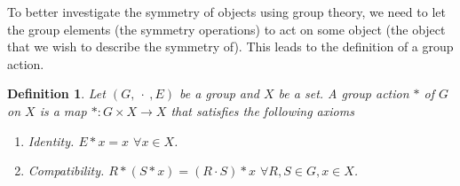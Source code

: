 \documentclass{article}
\theoremstyle{plain}\theoremheaderfont{\normalfont\itshape}\theorembodyfont{\rmfamily}\theoremseparator{.}\newtheorem*{rem}{Remark}\newtheorem*{ex}{Example}\newtheorem*{proof}{Proof}\newtheorem*{altp}{Alternative proof}
\theoremstyle{plain}\theoremheaderfont{\normalfont\bfseries}\theorembodyfont{\rmfamily}\theoremseparator{.}\newtheorem{thm}{Theorem}[section]\newtheorem{lem}[thm]{Lemma}\newtheorem{prop}[thm]{Proposition}\newtheorem*{cor}{Corollary}\newtheorem{defn}[thm]{Definition}\newtheorem{clm}[thm]{Claim}\newtheorem{clminproof}{Claim}\newtheorem*{law}{Law}\newtheorem{pos}[thm]{Postulate}
\theoremstyle{break}\theoremheaderfont{\normalfont\itshape}\theorembodyfont{\rmfamily}\theoremseparator{.\medskip}\newtheorem*{proofskip}{Proof}\newtheorem*{exs}{Examples}\newtheorem*{rems}{Remarks}
\theoremstyle{break}\theoremheaderfont{\normalfont\bfseries}\theorembodyfont{\rmfamily}\theoremseparator{.\medskip}\newtheorem{lemskip}[thm]{Lemma}\newtheorem{defnskip}[thm]{Definition}\newtheorem{propskip}[thm]{Proposition}\newtheorem{thmskip}[thm]{Theorem}
\numberwithin{equation}{section}
\begin{document}
    To better investigate the symmetry of objects using group theory, we need to let the group elements (the symmetry operations) to act on some object (the object that we wish to describe the symmetry of). This leads to the definition of a group action.
    \begin{defn}
        Let \((G, \ \cdot \ , E)\) be a group and \(X\) be a set. A \textit{group action} \(*\) of \(G\) on \(X\) is a map \(*:G\times X\to X\) that satisfies the following axioms
        \begin{enumerate}[topsep=0pt]
            \item \textit{Identity}. \(E*x=x\) \(\forall x\in X\).
            \item \textit{Compatibility}. \(R*(S*x)=(R\cdot S)*x\) \(\forall R,S\in G, x\in X\).
        \end{enumerate}
    \end{defn}
\end{document}
